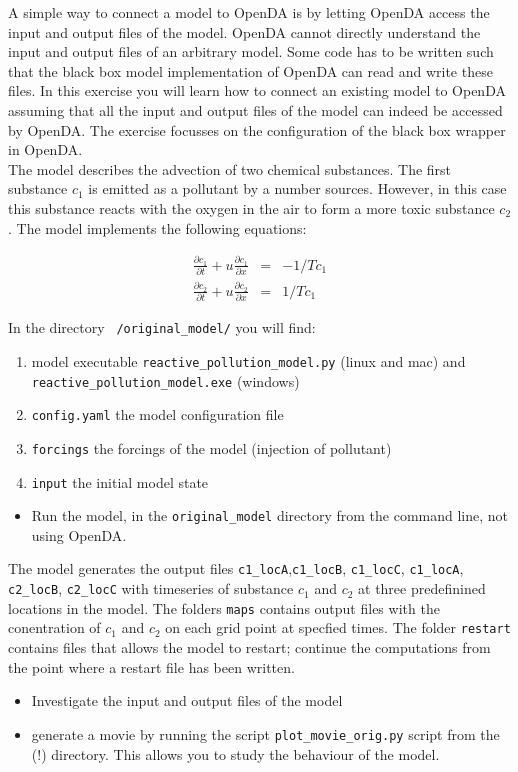 

A simple way to connect a model to OpenDA is by letting OpenDA access the input
and output files of the model. OpenDA cannot directly understand the input and
output files of an arbitrary model. Some code has to be written such that the
black box model implementation of OpenDA can read and write these files. In
this exercise you will learn how to connect an existing model to OpenDA
assuming that all the input and output files of the model can indeed be
accessed by OpenDA. The exercise focusses on the configuration of the black box
wrapper in OpenDA.\\

The model describes
the advection of two chemical substances. The first substance $c_1$ is emitted
as a pollutant by a number sources. However, in this case this substance reacts
with the oxygen in the air to form a more toxic substance $c_2$. The model
implements the following equations:

\begin{eqnarray}
    \frac{\partial c_1}{\partial t} + u\frac{\partial c_1}{\partial x} & = & -
    1/T c_1 \\
    \frac{\partial c_2}{\partial t} + u\frac{\partial c_2}{\partial x} & = &
    1/T c_1
\end{eqnarray}


In the directory {\tt { \opgave}/original\_model/} you will find:
\begin{enumerate}
	\item model executable {\tt reactive\_pollution\_model.py} (linux and mac)
	      and  {\tt reactive\_pollution\_model.exe} (windows)
	\item {\tt config.yaml} the model configuration file
        \item {\tt forcings} the forcings of the model (injection of pollutant)
	\item {\tt input} the initial model state 
\end{enumerate}


\begin{itemize}
	\item Run the model, in the {\tt original\_model} directory from the
	      command line, not using OpenDA.
\end{itemize}
The model generates the output files {\tt c1\_locA},{\tt c1\_locB},
{\tt c1\_locC}, {\tt c1\_locA}, {\tt c2\_locB}, {\tt c2\_locC} with timeseries
of substance $c_1$ and $c_2$ at three predefinined locations in the model. The
folders {\tt maps} contains output files with the conentration of $c_1$ and $c_2$ on each grid point at specfied times.
The folder {\tt restart} contains files that allows the model to restart; continue the computations from the point where a restart file has been written.
\begin{itemize}
	\item Investigate the input and output files of the model 
	\item generate a movie by running the script {\tt plot\_movie\_orig.py} script from the {\tt { \opgave}} (!) directory. This allows you  to study the behaviour of the model. 
\end{itemize}

